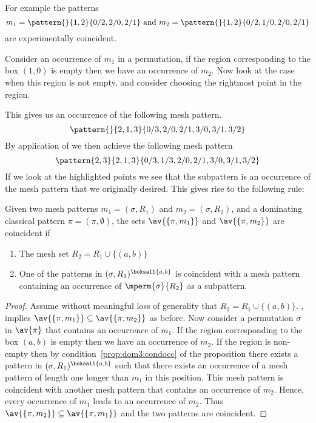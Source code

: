 For example the patterns
\begin{equation*}
    m_1 = \pattern{}{1,2}{0/2,2/0,2/1} \text{ and } m_2 = \pattern{}{1,2}{0/2,1/0,2/0,2/1}
\end{equation*}
are experimentally coincident.

Consider an occurrence of \(m_1\) in a permutation, if the region corresponding
to the box \((1,0)\) is empty then we have an occurrence of \(m_2\). Now look at
the case when this region is not empty, and consider choosing the rightmost
point in the region.

This gives us an occurrence of the following mesh pattern.
\begin{equation*}
    \pattern{}{2,1,3}{0/3,2/0,2/1,3/0,3/1,3/2}
\end{equation*}
By application of  we then achieve the following
mesh pattern
\begin{equation*}
    \pattern{2,3}{2,1,3}{0/3,1/3,2/0,2/1,3/0,3/1,3/2}
\end{equation*}
If we look at the highlighted points we see that the subpattern is an occurrence
of the mesh pattern that we originally desired. This gives rise to the following
rule:

\begin{proposition}
    \label{prop:dom3}
    Given two mesh patterns \(m_1 =(\sigma, R_1)\) and \(m_2 = (\sigma, R_2)\),
    and a dominating classical pattern \(\pi = (\pi,\emptyset)\), the sets
    \(\av{\{\pi,m_1\}}\) and \(\av{\{\pi,m_2\}}\) are coincident if
    \begin{enumerate}
        \item The mesh set \(R_2 = R_1 \cup \{(a,b)\}\)
        \item\label{prop:dom3:condocc} One of the patterns in \((\sigma,R_1)^\boksall{a,b}\)
            is coincident with a mesh pattern containing an occurrence of
            \(\mperm{\sigma}{R_2}\) as a subpattern.
    \end{enumerate}
\end{proposition}
\begin{proof}
    Assume without meaningful loss of generality that \(R_2 = R_1 \cup \{(a,b)\}\).
    , implies \(\av{\{\pi,m_1\}} \subseteq \av{\{\pi,m_2\}}\) as before.
    Now consider a permutation \(\sigma\) in \(\av{\pi}\) that contains an
    occurrence of \(m_1\). If the region corresponding to the box \((a,b)\)
    is empty then we have an occurrence of \(m_2\). If the region is non-empty
    then by condition~\ref{prop:dom3:condocc}  of the proposition there exists
    a pattern in \((\sigma,R_1)^\boksall{a,b}\) such that there exists an occurrence of a mesh pattern of
    length one longer than \(m_1\) in this position. This mesh pattern is
    coincident with another mesh pattern that contains an
    occurrence of \(m_2\). Hence, every occurrence of \(m_1\) leads to an occurrence
    of \(m_2\).  Thus \(\av{\{\pi,m_2\}} \subseteq \av{\{\pi,m_1\}}\) and the
    two patterns are coincident.
\end{proof}

